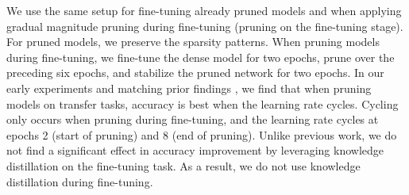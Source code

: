 \documentclass[10pt]{article}
\begin{document}
We use the same setup for fine-tuning already pruned models and when applying gradual magnitude pruning during fine-tuning (pruning on the fine-tuning stage). For pruned models, we preserve the sparsity patterns. When pruning models during fine-tuning, we fine-tune the dense model for two epochs, prune over the preceding six epochs, and stabilize the pruned network for two epochs. In our early experiments and matching prior findings \cite{Zafrir2021PruneOF}, we find that when pruning models on transfer tasks, accuracy is best when the learning rate cycles. Cycling only occurs when pruning during fine-tuning, and the learning rate cycles at epochs 2 (start of pruning) and 8 (end of pruning). Unlike previous work, we do not find a significant effect in accuracy improvement by leveraging knowledge distillation on the fine-tuning task. As a result, we do not use knowledge distillation during fine-tuning.
\end{document}
